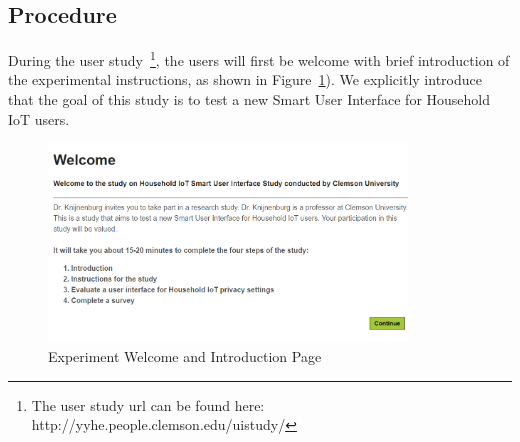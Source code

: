 \subsection{Procedure}
During the user study~\footnote{The user study url can be found here: http://yyhe.people.clemson.edu/uistudy/}, the users will first be welcome with brief introduction of the experimental instructions, as shown in Figure~\ref{fig:us1}). We explicitly introduce that the goal of this study is to test a new Smart User Interface for Household IoT users.

\begin{figure}
	\centering
	\includegraphics[width=0.85\textwidth]{figures/userstudy1.png}
	\caption{Experiment Welcome and Introduction Page}
	\label{fig:us1}
\end{figure}

